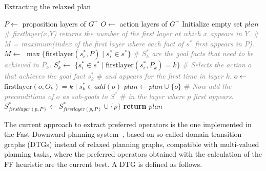 \documentclass[ppgc,diss,english]{iiufrgs}
\begin{document}
\begin{algorithm}[tb]
\caption{Extracting the relaxed plan}
\label{alg:extracting-relaxed-plan}
\begin{algorithmic}[1]
  \State $P \gets$ proposition layers of $G^{+}$
  \State $O \gets$ action layers of $G^{+}$
  \State Initialize empty set $plan$
  \State \textcolor{gray}{\# \emph{firstlayer($x$,$Y$) returns the number of the first layer at which $x$ appears in $Y$.}}
  \State \textcolor{gray}{\# \emph{M = maximum(index of the first layer where each fact of $s^{*}$ first appears in $P$).}}
  \State $M \gets$ $\max \{\text{firstlayer}(s_{i}^{*}, P) \mid s_{i}^{*} \in s^{*}\}$
    \State \textcolor{gray}{\# \emph{$S_{k}^{*}$ are the goal facts that need to be achieved in $P_{k}$.}}
    \State $S_{k}^{*} \gets$ $\{s_{i}^{*} \in s^{*} \mid \text{firstlayer}(s_{i}^{*}, P_{k}) = k\}$
  \EndFor
      \State \textcolor{gray}{\# \emph{Selects the action $o$ that achieves the goal fact $s_{k}^{*}$}}
      \State \textcolor{gray}{\# \emph{and appears for the first time in layer $k$}.}
      \State $o \gets$ $\text{firstlayer}(o, O_{k}) = k \mid s_{k}^{*} \in add(o)$
      \State $plan \gets plan \cup \{o\}$
      \State \textcolor{gray}{\# \emph{Now add the preconditions of $o$ as sub-goals to $S^{*}$}}
      \State \textcolor{gray}{\# \emph{in the layer where $p$ first appears}.}
        \State $S_{firstlayer(p, P)}^{*} \gets S_{firstlayer(p, P)}^{*} \cup \{p\}$
      \EndFor
    \EndFor
  \EndFor
  \State \textbf{return} $plan$
\EndProcedure
\end{algorithmic}
\end{algorithm}


The current approach to extract preferred operators is the one implemented in the Fast Downward planning system~\cite{Helmert/2009}, based on so-called domain transition graphs (DTGs) instead of relaxed planning graphs, compatible with multi-valued planning tasks, where the preferred operators obtained with the calculation of the FF heuristic are the current best. A DTG is defined as follows.
\end{document}
